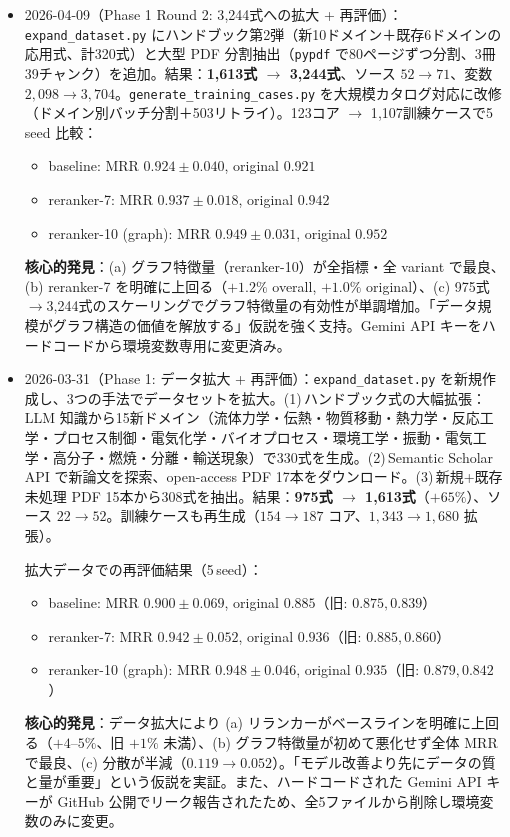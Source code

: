 \documentclass[11pt,a4paper]{jsarticle}
\begin{document}
\begin{itemize}[nosep]
  \item 2026-04-09（Phase 1 Round 2: 3{,}244式への拡大 + 再評価）：\texttt{expand\_dataset.py} にハンドブック第2弾（新10ドメイン＋既存6ドメインの応用式、計320式）と大型 PDF 分割抽出（\texttt{pypdf} で80ページずつ分割、3冊39チャンク）を追加。結果：\textbf{1{,}613式 $\to$ 3{,}244式}、ソース $52 \to 71$、変数 $2{,}098 \to 3{,}704$。\texttt{generate\_training\_cases.py} を大規模カタログ対応に改修（ドメイン別バッチ分割＋503リトライ）。123コア $\to$ 1{,}107訓練ケースで5\,seed 比較：
  \begin{itemize}[nosep]
    \item baseline: MRR $0.924 \pm 0.040$, original $0.921$
    \item reranker-7: MRR $0.937 \pm 0.018$, original $0.942$
    \item reranker-10 (graph): MRR $\mathbf{0.949 \pm 0.031}$, original $\mathbf{0.952}$
  \end{itemize}
  \textbf{核心的発見}：(a) グラフ特徴量（reranker-10）が全指標・全 variant で最良、(b) reranker-7 を明確に上回る（$+1.2\%$ overall, $+1.0\%$ original）、(c) 975式$\to$3{,}244式のスケーリングでグラフ特徴量の有効性が単調増加。「データ規模がグラフ構造の価値を解放する」仮説を強く支持。Gemini API キーをハードコードから環境変数専用に変更済み。

  \item 2026-03-31（Phase 1: データ拡大 + 再評価）：\texttt{expand\_dataset.py} を新規作成し、3つの手法でデータセットを拡大。(1)\,ハンドブック式の大幅拡張：LLM 知識から15新ドメイン（流体力学・伝熱・物質移動・熱力学・反応工学・プロセス制御・電気化学・バイオプロセス・環境工学・振動・電気工学・高分子・燃焼・分離・輸送現象）で330式を生成。(2)\,Semantic Scholar API で新論文を探索、open-access PDF 17本をダウンロード。(3)\,新規+既存未処理 PDF 15本から308式を抽出。結果：\textbf{975式 $\to$ 1{,}613式}（$+65\%$）、ソース $22 \to 52$。訓練ケースも再生成（$154 \to 187$ コア、$1{,}343 \to 1{,}680$ 拡張）。

  拡大データでの再評価結果（5\,seed）：
  \begin{itemize}[nosep]
    \item baseline: MRR $0.900 \pm 0.069$, original $0.885$（旧: $0.875, 0.839$）
    \item reranker-7: MRR $0.942 \pm 0.052$, original $0.936$（旧: $0.885, 0.860$）
    \item reranker-10 (graph): MRR $\mathbf{0.948 \pm 0.046}$, original $0.935$（旧: $0.879, 0.842$）
  \end{itemize}
  \textbf{核心的発見}：データ拡大により (a) リランカーがベースラインを明確に上回る（$+4\text{--}5\%$、旧 $+1\%$ 未満）、(b) グラフ特徴量が初めて悪化せず全体 MRR で最良、(c) 分散が半減（$0.119 \to 0.052$）。「モデル改善より先にデータの質と量が重要」という仮説を実証。また、ハードコードされた Gemini API キーが GitHub 公開でリーク報告されたため、全5ファイルから削除し環境変数のみに変更。


\end{itemize}
\end{document}
